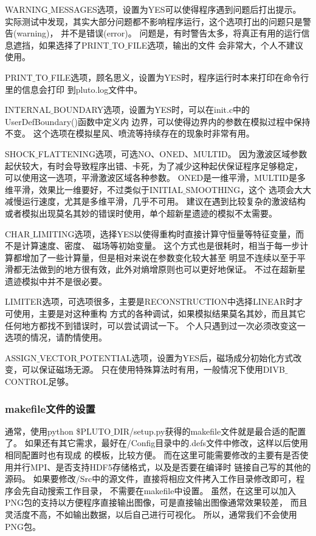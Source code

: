 WARNING$\_$MESSAGES选项，设置为YES可以使得程序遇到问题后打出提示。
实际测试中发现，其实大部分问题都不影响程序运行，这个选项打出的问题只是警告(warning)，
并不是错误(error)。
问题是，有时警告太多，将真正有用的运行信息遮挡，如果选择了PRINT$\_$TO$\_$FILE选项，输出的文件
会非常大，个人不建议使用。

PRINT$\_$TO$\_$FILE选项，顾名思义，设置为YES时，程序运行时本来打印在命令行里的信息会打印
到pluto.log文件中。

INTERNAL$\_$BOUNDARY选项，设置为YES时，可以在init.c中的UserDefBoundary()函数中定义内
边界，可以使得边界内的参数在模拟过程中保持不变。
这个选项在模拟星风、喷流等持续存在的现象时非常有用。

SHOCK$\_$FLATTENING选项，可选NO、ONED、MULTID。
因为激波区域参数起伏较大，有时会导致程序出错、卡死，为了减少这种起伏保证程序足够稳定，
可以使用这一选项，平滑激波区域各种参数。
ONED是一维平滑，MULTID是多维平滑，效果比一维要好，不过类似于INITIAL$\_$SMOOTHING，这个
选项会大大减慢运行速度，尤其是多维平滑，几乎不可用。
建议在遇到比较复杂的激波结构或者模拟出现莫名其妙的错误时使用，单个超新星遗迹的模拟不太需要。

CHAR$\_$LIMITING选项，选择YES以使得重构时直接计算守恒量等特征变量，而不是计算速度、密度、
磁场等初始变量。
这个方式也是很耗时，相当于每一步计算都增加了一些计算量，但是相对来说在参数变化较大甚至
明显不连续以至于平滑都无法做到的地方很有效，此外对熵增原则也可以更好地保证。
不过在超新星遗迹模拟中并不是很必要。

LIMITER选项，可选项很多，主要是RECONSTRUCTION中选择LINEAR时才可使用，主要是对这种重构
方式的各种调试，如果模拟结果莫名其妙，而且其它任何地方都找不到错误时，可以尝试调试一下。
个人只遇到过一次必须改变这一选项的情况，请酌情使用。

ASSIGN$\_$VECTOR$\_$POTENTIAL选项，设置为YES后，磁场成分初始化方式改变，可以保证磁场无源。
只在使用特殊算法时有用，一般情况下使用DIVB$\_$CONTROL足够。

\subsubsection{makefile文件的设置}
通常，使用python \$PLUTO$\_$DIR/setup.py获得的makefile文件就是最合适的配置了。
如果还有其它需求，最好在/Config目录中的.defs文件中修改，这样以后使用相同配置时也有现成
的模板，比较方便。
而在这里可能需要修改的主要有是否使用并行MPI、是否支持HDF5存储格式，以及是否要在编译时
链接自己写的其他的源码。
如果要修改/Src中的源文件，直接将相应文件拷入工作目录修改即可，程序会先自动搜索工作目录，
不需要在makefile中设置。
虽然，在这里可以加入PNG包的支持以方便程序直接输出图像，可是直接输出图像通常效果较差，
而且灵活度不高，不如输出数据，以后自己进行可视化。
所以，通常我们不会使用PNG包。

